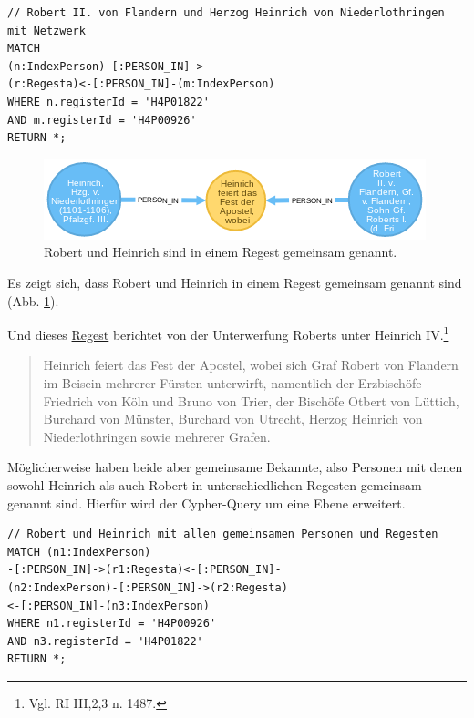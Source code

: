 \documentclass[ngerman,]{scrreprt}
\begin{document}
\begin{verbatim}
// Robert II. von Flandern und Herzog Heinrich von Niederlothringen mit Netzwerk
MATCH
(n:IndexPerson)-[:PERSON_IN]->
(r:Regesta)<-[:PERSON_IN]-(m:IndexPerson)
WHERE n.registerId = 'H4P01822'
AND m.registerId = 'H4P00926'
RETURN *;
\end{verbatim}

\begin{figure}
\centering
\includegraphics{Bilder/RI2Graph/RobertundHeinrich.png}
\caption{Robert und Heinrich sind in einem Regest gemeinsam genannt.}
\label{robertundheinrich}
\end{figure}

Es zeigt sich, dass Robert und Heinrich in einem Regest gemeinsam genannt sind (Abb. \ref{robertundheinrich}).

Und dieses \href{http://www.regesta-imperii.de/id/cf75356b-bd0d-4a67-8aeb-3ae27d1dcefa}{Regest} berichtet von der Unterwerfung Roberts unter Heinrich IV.\footnote{Vgl. RI III,2,3 n. 1487.}

\begin{quote}
Heinrich feiert das Fest der Apostel, wobei sich Graf Robert von Flandern im Beisein mehrerer Fürsten unterwirft, namentlich der Erzbischöfe Friedrich von Köln und Bruno von Trier, der Bischöfe Otbert von Lüttich, Burchard von Münster, Burchard von Utrecht, Herzog Heinrich von Niederlothringen sowie mehrerer Grafen.
\end{quote}

Möglicherweise haben beide aber gemeinsame Bekannte, also Personen mit denen sowohl Heinrich als auch Robert in unterschiedlichen Regesten gemeinsam genannt sind. Hierfür wird der Cypher-Query um eine Ebene erweitert.

\begin{verbatim}
// Robert und Heinrich mit allen gemeinsamen Personen und Regesten
MATCH (n1:IndexPerson)
-[:PERSON_IN]->(r1:Regesta)<-[:PERSON_IN]-
(n2:IndexPerson)-[:PERSON_IN]->(r2:Regesta)
<-[:PERSON_IN]-(n3:IndexPerson)
WHERE n1.registerId = 'H4P00926'
AND n3.registerId = 'H4P01822'
RETURN *;
\end{verbatim}
\end{document}
